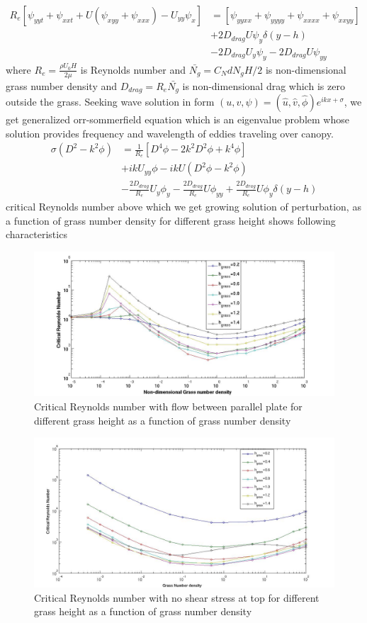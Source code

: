 \documentclass[aps,preprint,floatfix,prl]{revtex4-1}
\begin{document}
\begin{equation}
\begin{split}
 R_{e}\left[\psi_{yyt}+\psi_{xxt}+U\left(\psi_{xyy}+\psi_{xxx}\right)-U_{yy}\psi_{x} \right] &=\left[\psi_{yyxx}+\psi_{yyyy}+\psi_{xxxx}+\psi_{xxyy} \right]\\
& + 2D_{drag}U\psi_{y}\delta(y-h)\\
& - 2D_{drag}U_{y}\psi_{y} -2D_{drag}U\psi_{yy}
\end{split}
\end{equation}
where $R_{e}= \frac{\rho U_0 H}{2\mu}$ is Reynolds number and $\bar{N_g} = C_N d N_g H/2$ is non-dimensional grass number density and  $D_{drag} = R_{e}\bar{N_{g}}$ is non-dimensional drag
which is zero outside the grass. Seeking wave solution in form $\left(u,v,\psi \right)= \left(\hat u, \hat v, \hat\phi \right)e^{ikx+\sigma}$, we get generalized orr-sommerfield equation 
which is an eigenvalue problem whose solution provides frequency and wavelength of eddies traveling over canopy.
\begin{equation}
\begin{split}
\sigma \left(D^2-k^2\phi \right) &= \frac{1}{R_{e}}\left[D^4\phi -2k^{2}D^2\phi +k^{4}\phi \right]\\
				  & +ikU_{yy}\phi-ikU\left(D^2\phi-k^2\phi \right)\\
 & -\frac{2D_{drag}}{R_{e}}U_{y}\phi_{y}-\frac{2D_{drag}}{R_{e}}U\phi_{yy}+\frac{2D_{drag}}{R_{e}}U\phi_{y}\delta(y-h)
\end{split}
\end{equation}
critical Reynolds number above which we get growing solution of perturbation, as a function of grass number density for different grass height shows following characteristics 
  \begin{figure}[htb!]
  \includegraphics[scale=0.35]{Instability2}
\caption{Critical Reynolds number with flow between parallel plate for different grass height as a function of grass number density}
\end{figure}

\begin{figure}[htb!]
  \includegraphics[scale=0.35]{Instability1_free.jpg}
\caption{Critical Reynolds number with no shear stress at top for different grass height as a function of grass number density}
\end{figure}
\end{document}
